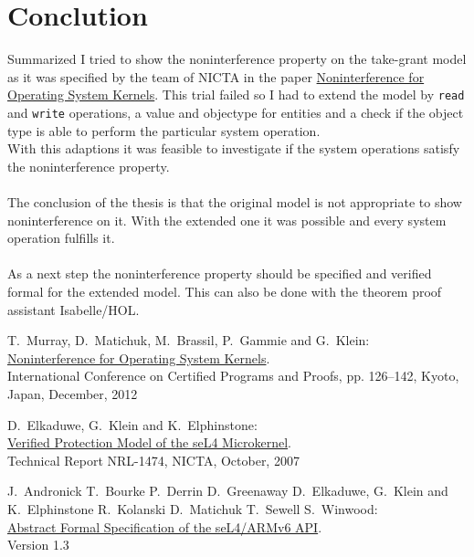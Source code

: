 \documentclass[11pt,a4paper,twoside]{article}
\begin{document}
{\section{Conclution}
Summarized I tried to show the noninterference property on the take-grant model as it was specified by the team of NICTA in the paper \href{http://www.ssrg.nicta.com/publications/nicta_full_text/6004.pdf}{%
		Noninterference for Operating System Kernels}. This trial failed so I had to extend the model by \texttt{read} and \texttt{write} operations, a value and objectype for entities and a check if the object type is able to perform the particular system operation. \\
		With this adaptions it was feasible to investigate if the system operations satisfy the noninterference property. \\ \\
		The conclusion of the thesis is that the original model is not appropriate to show noninterference on it. With the extended one it was possible and every system operation fulfills it. \\ \\
		As a next step the noninterference property should be specified and verified formal for the extended model. This can also be done with the theorem proof assistant Isabelle/HOL.  
\clearpage
	\begin{thebibliography}{99}

	T.\ Murray, D.\ Matichuk, M.\ Brassil, P.\ Gammie and G.\ Klein:	\\ 
	\href{http://www.ssrg.nicta.com/publications/nicta_full_text/6004.pdf}{%
		Noninterference for Operating System Kernels}. \\
    International Conference on Certified Programs and Proofs, pp. 126–142, Kyoto, Japan, December, 2012

	D.\ Elkaduwe, G.\ Klein and K.\ Elphinstone:	\\ 
	\href{http://ts.data61.csiro.au/publications/nicta_full_text/1474.pdf}{%
		Verified Protection Model of the seL4 Microkernel}. \\
   	Technical Report NRL-1474, NICTA, October, 2007
   	
	J.\ Andronick T.\ Bourke P.\ Derrin D.\ Greenaway D.\ Elkaduwe, G.\ Klein and K.\ Elphinstone R.\ Kolanski D.\ Matichuk T.\ Sewell S.\ Winwood:	\\ 
	\href{https://sel4.systems/Info/Docs/seL4-spec.pdf}{%
		Abstract Formal Specification of the seL4/ARMv6 API}. \\
   	Version 1.3
   	

\end{thebibliography}}
\end{document}
